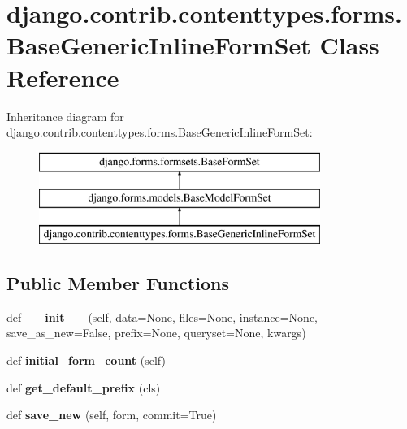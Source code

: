 \hypertarget{classdjango_1_1contrib_1_1contenttypes_1_1forms_1_1_base_generic_inline_form_set}{}\section{django.\+contrib.\+contenttypes.\+forms.\+Base\+Generic\+Inline\+Form\+Set Class Reference}
\label{classdjango_1_1contrib_1_1contenttypes_1_1forms_1_1_base_generic_inline_form_set}
Inheritance diagram for django.\+contrib.\+contenttypes.\+forms.\+Base\+Generic\+Inline\+Form\+Set\+:\begin{figure}[H]
\begin{center}
\leavevmode
\includegraphics[height=3.000000cm]{classdjango_1_1contrib_1_1contenttypes_1_1forms_1_1_base_generic_inline_form_set}
\end{center}
\end{figure}
\subsection*{Public Member Functions}
\begin{DoxyCompactItemize}
\item 
\mbox{\label{classdjango_1_1contrib_1_1contenttypes_1_1forms_1_1_base_generic_inline_form_set_a1256dc0a7cfe1d01966342f087550d43}} 
def {\bfseries \+\_\+\+\_\+init\+\_\+\+\_\+} (self, data=None, files=None, instance=None, save\+\_\+as\+\_\+new=False, prefix=None, queryset=None, kwargs)
\item 
\mbox{\label{classdjango_1_1contrib_1_1contenttypes_1_1forms_1_1_base_generic_inline_form_set_ac3f6ce4eb97005dc1f89a2a478e321ea}} 
def {\bfseries initial\+\_\+form\+\_\+count} (self)
\item 
\mbox{\label{classdjango_1_1contrib_1_1contenttypes_1_1forms_1_1_base_generic_inline_form_set_ab85c800200795cd6cc631f2da12aa87f}} 
def {\bfseries get\+\_\+default\+\_\+prefix} (cls)
\item 
\mbox{\label{classdjango_1_1contrib_1_1contenttypes_1_1forms_1_1_base_generic_inline_form_set_a8941be2820773f4eed6ca30a15f2c59e}} 
def {\bfseries save\+\_\+new} (self, form, commit=True)
\end{DoxyCompactItemize}
